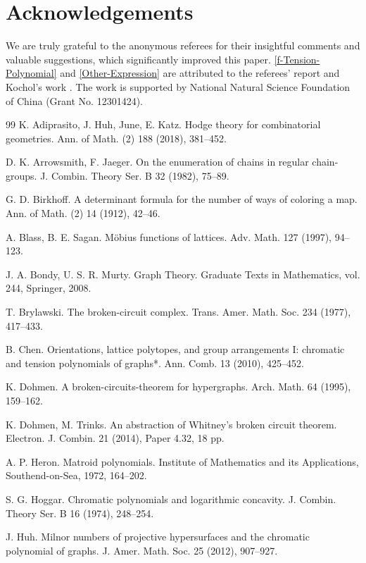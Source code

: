 \documentclass[12pt]{article}%
\numberwithin{equation}{section}
\begin{document}
\section*{Acknowledgements}
We are truly grateful to the anonymous referees for their insightful comments and valuable suggestions, which significantly improved this paper. \autoref{f-Tension-Polynomial} and \autoref{Other-Expression} are attributed to the referees' report and Kochol's work \cite{Kochol2024}. The work is supported by National Natural Science Foundation of China (Grant No. 12301424).
\begin{thebibliography}{99}\setlength{\itemsep}{-.0mm}
K. Adiprasito, J. Huh, June, E. Katz. Hodge theory for combinatorial geometries. Ann. of Math. (2) 188 (2018), 381--452.

D. K. Arrowsmith, F. Jaeger. On the enumeration of chains in regular chain-groups. J. Combin. Theory Ser. B 32 (1982), 75--89.

G. D. Birkhoff. A determinant formula for the number of ways of coloring a map. Ann. of Math. (2) 14 (1912), 42--46.

A. Blass, B. E.  Sagan. M\"obius functions of lattices. Adv. Math. 127 (1997), 94--123.

J. A. Bondy, U. S. R. Murty. Graph Theory. Graduate Texts in Mathematics, vol. 244, Springer, 2008.

T. Brylawski. The broken-circuit complex. Trans. Amer. Math. Soc. 234 (1977), 417--433.

B. Chen. Orientations, lattice polytopes, and group arrangements I: chromatic and tension polynomials of graphs*. Ann. Comb. 13 (2010), 425--452.

K. Dohmen. A broken-circuits-theorem for hypergraphs. Arch. Math. 64 (1995), 159--162.

K. Dohmen, M. Trinks. An abstraction of Whitney's broken circuit theorem. Electron. J. Combin. 21 (2014), Paper 4.32, 18 pp.

A. P. Heron. Matroid polynomials. Institute of Mathematics and its Applications, Southend-on-Sea, 1972, 164--202.

S. G. Hoggar. Chromatic polynomials and logarithmic concavity. J. Combin. Theory Ser. B 16 (1974), 248--254.

J. Huh. Milnor numbers of projective hypersurfaces and the chromatic polynomial of graphs. J. Amer. Math. Soc. 25 (2012), 907--927.


\end{thebibliography}
\end{document}
